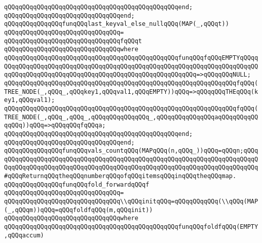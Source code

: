 \verb|qQQqqQQqqQQqqQQqqQQqqQQqqQQqqQQqqQQqqQQqqQQqqQQqend;|\newline
\verb|qQQqqQQqqQQqqQQqqQQqqQQqqQQqqQQqend;|\newline
\newline
\verb|qQQqqQQqqQQqqQQqfunqQQqlast_keyval_else_nullqQQq(MAP(_,qQQqt))|\newline
\verb|qQQqqQQqqQQqqQQqqQQqqQQqqQQqqQQq=|\newline
\verb|qQQqqQQqqQQqqQQqqQQqqQQqqQQqqQQqfqQQqt|\newline
\verb|qQQqqQQqqQQqqQQqqQQqqQQqqQQqqQQqwhere|\newline
\verb|qQQqqQQqqQQqqQQqqQQqqQQqqQQqqQQqqQQqqQQqqQQqqQQqfunqQQqfqQQqEMPTYqQQqqQQqqQQqqQQqqQQqqQQqqQQqqQQqqQQqqQQqqQQqqQQqqQQqqQQqqQQqqQQqqQQqqQQqqQQqqQQqqQQqqQQqqQQqqQQqqQQqqQQqqQQqqQQqqQQqqQQqqQQqqQQq=>qQQqqQQqNULL;|\newline
\verb|qQQqqQQqqQQqqQQqqQQqqQQqqQQqqQQqqQQqqQQqqQQqqQQqqQQqqQQqqQQqqQQqfqQQq(TREE_NODE(_,qQQq_,qQQqkey1,qQQqval1,qQQqEMPTY))qQQq=>qQQqqQQqTHEqQQq(key1,qQQqval1);|\newline
\verb|qQQqqQQqqQQqqQQqqQQqqQQqqQQqqQQqqQQqqQQqqQQqqQQqqQQqqQQqqQQqqQQqfqQQq(TREE_NODE(_,qQQq_,qQQq_,qQQqqQQqqQQqqQQq_,qQQqqQQqqQQqqQQqaqQQqqQQqqQQqqQQq))qQQq=>qQQqqQQqfqQQqa;|\newline
\verb|qQQqqQQqqQQqqQQqqQQqqQQqqQQqqQQqqQQqqQQqqQQqqQQqend;|\newline
\verb|qQQqqQQqqQQqqQQqqQQqqQQqqQQqqQQqend;|\newline
\newline
\newline
\verb|qQQqqQQqqQQqqQQqfunqQQqvals_countqQQq(MAPqQQq(n,qQQq_))qQQq=qQQqn;qQQqqQQqqQQqqQQqqQQqqQQqqQQqqQQqqQQqqQQqqQQqqQQqqQQqqQQqqQQqqQQqqQQqqQQqqQQqqQQqqQQqqQQqqQQqqQQqqQQqqQQqqQQqqQQqqQQqqQQqqQQqqQQqqQQqqQQqqQQqqQQq#qQQqReturnqQQqtheqQQqnumberqQQqofqQQqitemsqQQqinqQQqtheqQQqmap.|\newline
\newline
\verb|qQQqqQQqqQQqqQQqfunqQQqfold_forwardqQQqf|\newline
\verb|qQQqqQQqqQQqqQQqqQQqqQQqqQQqqQQq=|\newline
\verb|qQQqqQQqqQQqqQQqqQQqqQQqqQQqqQQq\\qQQqinitqQQq=qQQqqQQqqQQq(\\qQQq(MAP(_,qQQqm))qQQq=qQQqfoldfqQQq(m,qQQqinit))|\newline
\verb|qQQqqQQqqQQqqQQqqQQqqQQqqQQqqQQqwhere|\newline
\verb|qQQqqQQqqQQqqQQqqQQqqQQqqQQqqQQqqQQqqQQqqQQqqQQqfunqQQqfoldfqQQq(EMPTY,qQQqaccum)|\newline
